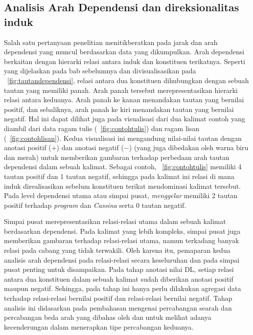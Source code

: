 \subsection{Analisis Arah Dependensi dan direksionalitas induk}
Salah satu pertanyaan penelitian menitikberatkan pada jarak dan arah dependensi yang muncul berdasarkan data yang dikumpulkan. Arah dependensi berkaitan dengan hierarki relasi antara induk dan konstituen terikatnya. Seperti yang dijelaskan pada bab sebelumnya dan divisualisasikan pada \pic~\ref{fig:tautandependensi}, relasi antara dua konstituen dihubungkan dengan sebuah tautan yang memiliki panah. Arah panah tersebut merepresentasikan hierarki relasi antara keduanya. Arah panah ke kanan menandakan tautan yang bernilai positif, dan sebaliknya, arah panah ke kiri menandakan tautan yang bernilai negatif. Hal ini dapat dilihat juga pada visualisasi dari dua kalimat contoh yang diambil dari data ragam tulis (\pic~\ref{fig:contohtulis}) dan ragam lisan (\pic~\ref{fig:contohlisan}). Kedua visualisasi ini mengandung nilai-nilai tautan dengan anotasi positif ($+$) dan anotasi negatif ($-$) (yang juga dibedakan oleh warna biru dan merah) untuk memberikan gambaran terhadap perbedaan arah tautan dependensi dalam sebuah kalimat. Sebagai contoh, \pic~\ref{fig:contohtulis} memiliki 4 tautan positif dan 1 tautan negatif, sehingga pada kalimat ini relasi di mana induk direalisasikan sebelum konstituen terikat mendominasi kalimat tersebut. Pada level dependensi utama atau simpai pusat, \textit{menggelar} memiliki 2 tautan positif terhadap \textit{program} dan \textit{Cassina} serta 0 tautan negatif.

Simpai pusat merepresentasikan relasi-relasi utama dalam sebuah kalimat berdasarkan dependensi. Pada kalimat yang lebih kompleks, simpai pusat juga memberikan gambaran terhadap relasi-relasi utama, namun terkadang banyak relasi pada cabang yang tidak terwakili. Oleh karena itu, pemaparan kedua analisis arah dependensi pada relasi-relasi secara keseluruhan dan pada simpai pusat penting untuk disampaikan. Pada tahap anotasi nilai DL, setiap relasi antara dua konstituen dalam sebuah kalimat sudah diberikan anotasi positif maupun negatif. Sehingga, pada tahap ini hanya perlu dilakukan agregasi data terhadap relasi-relasi bernilai positif dan relasi-relasi bernilai negatif. Tahap analisis ini didasarkan pada pembahasan mengenai percabangan searah dan percabangan beda arah yang dibahas oleh \cite{temperley2008dependency} dan \cite{dryer1992greenbergian} untuk melihat adanya kecenderungan dalam menerapkan tipe percabangan keduanya.

